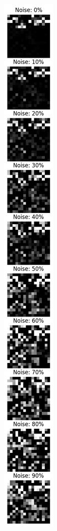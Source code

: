 \begin{figure}[ht]
    \centering
    \begin{minipage}{0.45\textwidth}
        \centering
        \includegraphics[width=0.31\linewidth]{images/vertical_noise_grid_100.png}

\end{minipage}
\end{figure}
